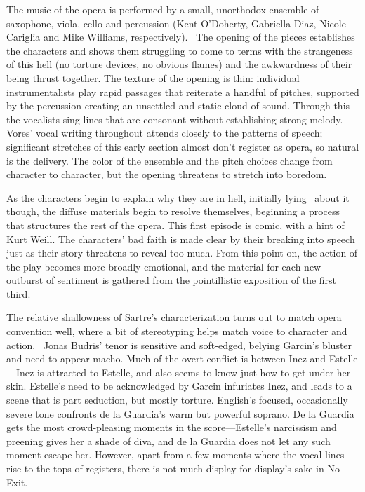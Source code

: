 The music of the opera is performed by a small, unorthodox ensemble of saxophone, viola, cello and percussion (Kent O’Doherty, Gabriella Diaz, Nicole Cariglia and Mike Williams, respectively).  The opening of the pieces establishes the characters and shows them struggling to come to terms with the strangeness of this hell (no torture devices, no obvious flames) and the awkwardness of their being thrust together. The texture of the opening is thin: individual instrumentalists play rapid passages that reiterate a handful of pitches, supported by the percussion creating an unsettled and static cloud of sound. Through this the vocalists sing lines that are consonant without establishing strong melody. Vores’ vocal writing throughout attends closely to the patterns of speech; significant stretches of this early section almost don’t register as opera, so natural is the delivery. The color of the ensemble and the pitch choices change from character to character, but the opening threatens to stretch into boredom.

As the characters begin to explain why they are in hell, initially lying  about it though, the diffuse materials begin to resolve themselves, beginning a process that structures the rest of the opera. This first episode is comic, with a hint of Kurt Weill. The characters’ bad faith is made clear by their breaking into speech just as their story threatens to reveal too much. From this point on, the action of the play becomes more broadly emotional, and the material for each new outburst of sentiment is gathered from the pointillistic exposition of the first third.

The relative shallowness of Sartre’s characterization turns out to match opera convention well, where a bit of stereotyping helps match voice to character and action.  Jonas Budris’ tenor is sensitive and soft-edged, belying Garcin’s bluster and need to appear macho. Much of the overt conflict is between Inez and Estelle—Inez is attracted to Estelle, and also seems to know just how to get under her skin. Estelle’s need to be acknowledged by Garcin infuriates Inez, and leads to a scene that is part seduction, but mostly torture. English’s focused, occasionally severe tone confronts de la Guardia’s warm but powerful soprano. De la Guardia gets the most crowd-pleasing moments in the score—Estelle’s narcissism and preening gives her a shade of diva, and de la Guardia does not let any such moment escape her. However, apart from a few moments where the vocal lines rise to the tops of registers, there is not much display for display’s sake in No Exit.

